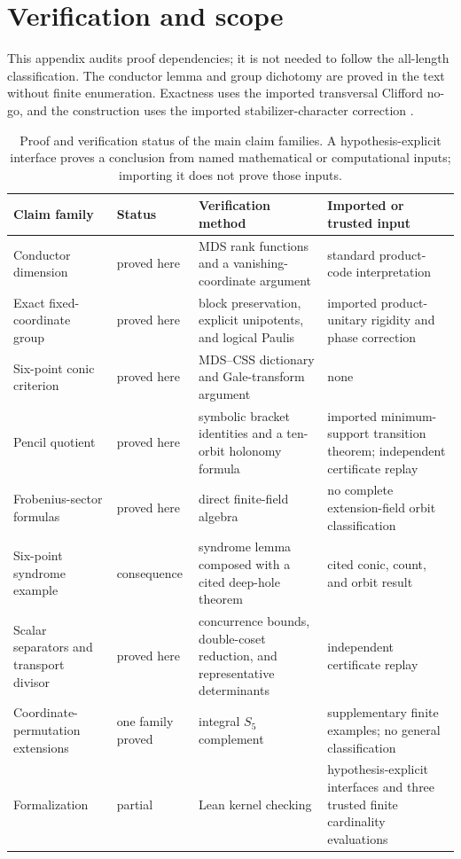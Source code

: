 \section{Verification and scope}\label{sec:verification}

This appendix audits proof dependencies; it is not needed to follow the
all-length classification.  The conductor lemma and group dichotomy are
proved in the text without finite enumeration.  Exactness uses the imported
transversal Clifford no-go, and the construction uses the imported
stabilizer-character correction \cite{RuddAMEStabilizerRigidity2026}.

\begin{table}[H]
\centering
\small
\begin{tabular}{@{}L{.20\textwidth}L{.17\textwidth}L{.27\textwidth}L{.25\textwidth}@{}}
\toprule
Claim family & Status & Verification method & Imported or trusted input \\
\midrule
Conductor dimension & proved here & MDS rank functions and a vanishing-coordinate argument & standard product-code interpretation \\
Exact fixed-coordinate group & proved here & block preservation, explicit unipotents, and logical Paulis & imported product-unitary rigidity and phase correction \\
Six-point conic criterion & proved here & MDS--CSS dictionary and Gale-transform argument & none \\
Pencil quotient & proved here & symbolic bracket identities and a ten-orbit holonomy formula & imported minimum-support transition theorem; independent certificate replay \\
Frobenius-sector formulas & proved here & direct finite-field algebra & no complete extension-field orbit classification \\
Six-point syndrome example & consequence & syndrome lemma composed with a cited deep-hole theorem & cited conic, count, and orbit result \\
Scalar separators and transport divisor & proved here & concurrence bounds, double-coset reduction, and representative determinants & independent certificate replay \\
Coordinate-permutation extensions & one family proved & integral \(S_5\) complement & supplementary finite examples; no general classification \\
Formalization & partial & Lean kernel checking & hypothesis-explicit interfaces and three trusted finite cardinality evaluations \\
\bottomrule
\end{tabular}
\caption{Proof and verification status of the main claim families.  A
hypothesis-explicit interface proves a conclusion from named mathematical or
computational inputs; importing it does not prove those inputs.}
\label{tab:verification-status}
\end{table}

